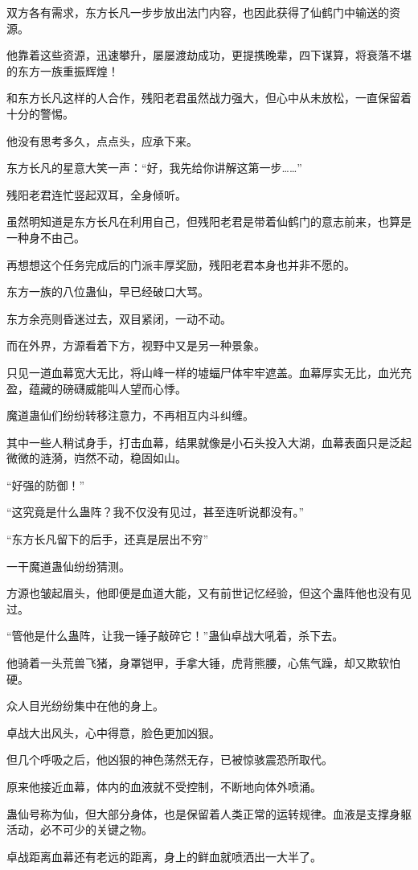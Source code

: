 \begin{this_body}
双方各有需求，东方长凡一步步放出法门内容，也因此获得了仙鹤门中输送的资源。

他靠着这些资源，迅速攀升，屡屡渡劫成功，更提携晚辈，四下谋算，将衰落不堪的东方一族重振辉煌！

和东方长凡这样的人合作，残阳老君虽然战力强大，但心中从未放松，一直保留着十分的警惕。

他没有思考多久，点点头，应承下来。

东方长凡的星意大笑一声：“好，我先给你讲解这第一步……”

残阳老君连忙竖起双耳，全身倾听。

虽然明知道是东方长凡在利用自己，但残阳老君是带着仙鹤门的意志前来，也算是一种身不由己。

再想想这个任务完成后的门派丰厚奖励，残阳老君本身也并非不愿的。

东方一族的八位蛊仙，早已经破口大骂。

东方余亮则昏迷过去，双目紧闭，一动不动。

而在外界，方源看着下方，视野中又是另一种景象。

只见一道血幕宽大无比，将山峰一样的墟蝠尸体牢牢遮盖。血幕厚实无比，血光充盈，蕴藏的磅礴威能叫人望而心悸。

魔道蛊仙们纷纷转移注意力，不再相互内斗纠缠。

其中一些人稍试身手，打击血幕，结果就像是小石头投入大湖，血幕表面只是泛起微微的涟漪，岿然不动，稳固如山。

“好强的防御！”

“这究竟是什么蛊阵？我不仅没有见过，甚至连听说都没有。”

“东方长凡留下的后手，还真是层出不穷”

一干魔道蛊仙纷纷猜测。

方源也皱起眉头，他即便是血道大能，又有前世记忆经验，但这个蛊阵他也没有见过。

“管他是什么蛊阵，让我一锤子敲碎它！”蛊仙卓战大吼着，杀下去。

他骑着一头荒兽飞猪，身罩铠甲，手拿大锤，虎背熊腰，心焦气躁，却又欺软怕硬。

众人目光纷纷集中在他的身上。

卓战大出风头，心中得意，脸色更加凶狠。

但几个呼吸之后，他凶狠的神色荡然无存，已被惊骇震恐所取代。

原来他接近血幕，体内的血液就不受控制，不断地向体外喷涌。

蛊仙号称为仙，但大部分身体，也是保留着人类正常的运转规律。血液是支撑身躯活动，必不可少的关键之物。

卓战距离血幕还有老远的距离，身上的鲜血就喷洒出一大半了。


\end{this_body}
